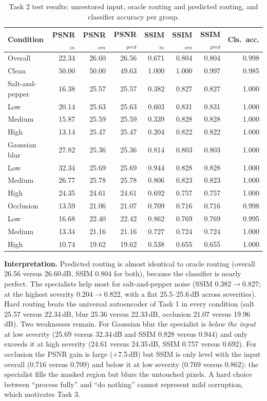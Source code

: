 \documentclass[conference]{IEEEtran}
\begin{document}
\begin{table}[t]
\centering
\caption{Task 2 test results: unrestored input, oracle routing and predicted routing, and classifier accuracy per group.}\label{tab:route}
\footnotesize\setlength{\tabcolsep}{5pt}
\begin{tabular}{@{}lrrrrrrr@{}}
\toprule
Condition & PSNR$_{in}$ & PSNR$_{ora}$ & PSNR$_{pred}$ & SSIM$_{in}$ & SSIM$_{ora}$ & SSIM$_{pred}$ & Cls.\ acc.\\
\midrule
Overall & 22.34 & 26.60 & 26.56 & 0.671 & 0.804 & 0.804 & 0.998 \\
\midrule
Clean & 50.00 & 50.00 & 49.63 & 1.000 & 1.000 & 0.997 & 0.985 \\
\midrule
Salt-and-pepper & 16.38 & 25.57 & 25.57 & 0.382 & 0.827 & 0.827 & 1.000 \\
\quad Low & 20.14 & 25.63 & 25.63 & 0.603 & 0.831 & 0.831 & 1.000 \\
\quad Medium & 15.87 & 25.59 & 25.59 & 0.339 & 0.828 & 0.828 & 1.000 \\
\quad High & 13.14 & 25.47 & 25.47 & 0.204 & 0.822 & 0.822 & 1.000 \\
\midrule
Gaussian blur & 27.82 & 25.36 & 25.36 & 0.814 & 0.803 & 0.803 & 1.000 \\
\quad Low & 32.34 & 25.69 & 25.69 & 0.944 & 0.828 & 0.828 & 1.000 \\
\quad Medium & 26.77 & 25.78 & 25.78 & 0.806 & 0.823 & 0.823 & 1.000 \\
\quad High & 24.35 & 24.61 & 24.61 & 0.692 & 0.757 & 0.757 & 1.000 \\
\midrule
Occlusion & 13.59 & 21.06 & 21.07 & 0.709 & 0.716 & 0.716 & 0.998 \\
\quad Low & 16.68 & 22.40 & 22.42 & 0.862 & 0.769 & 0.769 & 0.995 \\
\quad Medium & 13.34 & 21.16 & 21.16 & 0.727 & 0.724 & 0.724 & 1.000 \\
\quad High & 10.74 & 19.62 & 19.62 & 0.538 & 0.655 & 0.655 & 1.000 \\
\bottomrule
\end{tabular}
\end{table}

\textbf{Interpretation.} Predicted routing is almost identical to oracle routing (overall 26.56 versus 26.60\,dB, SSIM 0.804 for both), because the classifier is nearly perfect. The specialists help most for salt-and-pepper noise (SSIM 0.382$\to$0.827; at the highest severity 0.204$\to$0.822, with a flat 25.5--25.6\,dB across severities). Hard routing beats the universal autoencoder of Task 1 in every condition (salt 25.57 versus 22.34\,dB, blur 25.36 versus 22.33\,dB, occlusion 21.07 versus 19.96\,dB). Two weaknesses remain. For Gaussian blur the specialist is \emph{below the input} at low severity (25.69 versus 32.34\,dB and SSIM 0.828 versus 0.944) and only exceeds it at high severity (24.61 versus 24.35\,dB, SSIM 0.757 versus 0.692). For occlusion the PSNR gain is large (+7.5\,dB) but SSIM is only level with the input overall (0.716 versus 0.709) and below it at low severity (0.769 versus 0.862): the specialist fills the masked region but blurs the untouched pixels. A hard choice between ``process fully'' and ``do nothing'' cannot represent mild corruption, which motivates Task 3.
\end{document}
